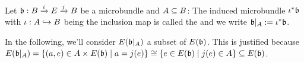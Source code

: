  \\
Let $\bb: \bundle{B}{E}{i}{j}$ be a microbundle and $A \sub B$:
The induced microbundle $\iota^*\bb$ with $\iota: A \incl B$ being the inclusion map is called the  and
we write $\bb \restr{A} := \iota^*\bb$.
\begin{remark}
In the following, we'll consider $E(\bb\restr{A})$ a subset of $E(\bb)$.
This is justified because
$E(\bb\restr{A}) = \{ (a, e) \in A \times E(\bb) \mid a = j(e) \} \cong \{ e \in E(\bb) \mid j(e) \in A \} \sub E(\bb)$.
\end{remark}